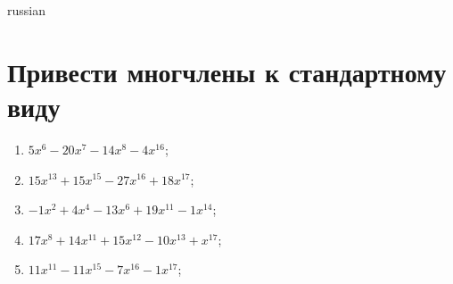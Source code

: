 \documentclass[a4paper]{article}
\begin{document}
\begin{otherlanguage*}{russian}

\section{Привести многчлены к стандартному виду}
\begin{enumerate}
\item $5x^6-20x^7-14x^8-4x^16$;
\item $15x^13 + 15x^15-27x^16 + 18x^17$;
\item $-1x^2 + 4x^4-13x^6 + 19x^11-1x^14$;
\item $17x^8 + 14x^11 + 15x^12-10x^13 + x^17$;
\item $11x^11-11x^15-7x^16-1x^17$;
\end{enumerate}
\end{otherlanguage*}
\end{document}
